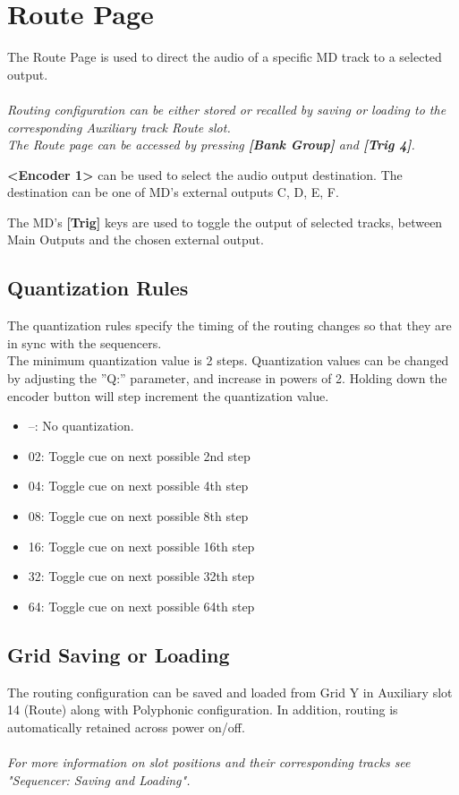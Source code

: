  \chapter{Route Page}
 The Route Page is used to direct the audio of a specific MD track to a selected output.\\\\\textit{Routing configuration can be either stored or recalled by saving or loading to the corresponding Auxiliary track Route slot.} \\
 
\textit{The Route page can be accessed by pressing \textbf{[Bank Group]} and \textbf{[Trig 4]}.}


\textbf{<Encoder 1>} can be used to select the audio output destination. The destination can be one of MD's external outputs C, D, E, F.

The MD's \textbf{[Trig]} keys are used to toggle the output of selected tracks, between Main Outputs and the chosen external output.

\newpage
\section{Quantization Rules}
The quantization rules specify the timing of the routing changes so that they are in sync with the sequencers.\\
The minimum quantization value is 2 steps. Quantization values can be changed by adjusting
the ”Q:” parameter, and increase in powers of 2. Holding down the encoder button will step
increment the quantization value.
 \begin{itemize}
\item --: No quantization.
\item 02: Toggle cue on next possible 2nd step
\item 04: Toggle cue on next possible 4th step
\item 08: Toggle cue on next possible 8th step 
\item 16: Toggle cue on next possible 16th step 
\item 32: Toggle cue on next possible 32th step 
\item 64: Toggle cue on next possible 64th step
 \end{itemize}
 
 \section{Grid Saving or Loading}
The routing configuration can be saved and loaded from Grid Y in Auxiliary slot 14 (Route) along with Polyphonic configuration. In addition, routing is automatically retained across power on/off.\\\\
\textit{For more information on slot positions and their corresponding tracks see  "Sequencer: Saving and Loading".}

 
 